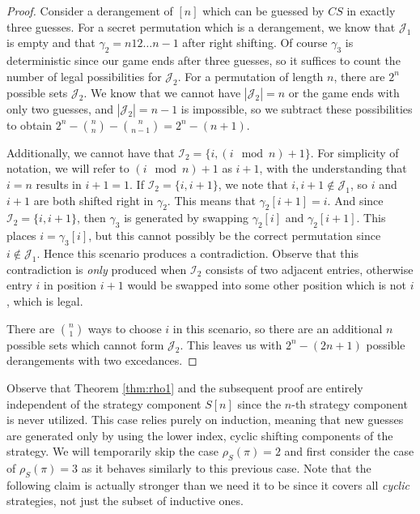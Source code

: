 \documentclass[article]{amsart}
\theoremstyle{definition}
\theoremstyle{definition}
\theoremstyle{remark}
\begin{document}
\begin{proof}
Consider a derangement of $[n]$ which can be guessed by $CS$ in exactly three guesses. For a secret permutation which is a derangement, we know that $\mathcal{J}_1$ is empty and that $\gamma_2 = n 12  \dots n-1$ after right shifting. Of course $\gamma_3$ is deterministic since our game ends after three guesses, so it suffices to count the number of legal possibilities for $\mathcal{J}_2$. For a permutation of length $n$, there are $2^n$ possible sets $\mathcal{J}_2$. We know that we cannot have $|\mathcal{J}_2| = n$ or the game ends with only two guesses, and $|\mathcal{J}_2| = n-1$ is impossible, so we subtract these possibilities to obtain $2^n - \binom{n}{n} - \binom{n}{n-1} = 2^n - (n + 1)$. 

Additionally, we cannot have that $\mathcal{I}_2 = \{i,(i\mod n)+1\}$. For simplicity of notation, we will refer to $(i \mod n) + 1$ as $i+1$, with the understanding that $i=n$ results in $i+1 = 1$. If $\mathcal{I}_2 = \{i,i+1\}$, we note that $i,i+1 \notin \mathcal{J}_1$, so $i$ and $i+1$ are both shifted right in $\gamma_2$. This means that $\gamma_2 [i+1] = i$. And since $\mathcal{I}_2 = \{i,i+1\}$, then $\gamma_3$ is generated by swapping $\gamma_2[i]$ and $\gamma_2[i+1]$. This places $i = \gamma_3[i]$, but this cannot possibly be the correct permutation since $i \notin \mathcal{J}_1$. Hence this scenario produces a contradiction. Observe that this contradiction is \textit{only} produced when $\mathcal{I}_2$ consists of two adjacent entries, otherwise entry $i$ in position $i+1$ would be swapped into some other position which is not $i$, which is legal.

There are $\binom{n}{1}$ ways to choose $i$ in this scenario, so there are an additional $n$ possible sets which cannot form $\mathcal{J}_2$. This leaves us with $2^n - (2n+1)$ possible derangements with two excedances.

\end{proof}

Observe that Theorem \ref{thm:rho1} and the subsequent proof are entirely independent of the strategy component $S[n]$ since the $n$-th strategy component is never utilized. This case relies purely on induction, meaning that new guesses are generated only by using the lower index, cyclic shifting components of the strategy. We will temporarily skip the case $\rho_S(\pi) = 2$ and first consider the case of $\rho_S(\pi) = 3$ as it behaves similarly to this previous case. Note that the following claim is actually stronger than we need it to be since it covers all \textit{cyclic} strategies, not just the subset of inductive ones. 
\end{document}
